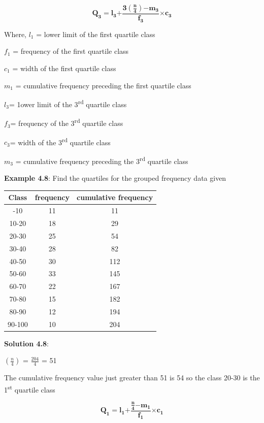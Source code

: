\documentclass[
]{book}
\begin{document}
\[\mathbf{Q}_{\mathbf{3}}\mathbf{=}\mathbf{l}_{\mathbf{3}}\mathbf{+}\frac{\mathbf{3}\left( \frac{\mathbf{n}}{\mathbf{4}} \right)\mathbf{-}\mathbf{m}_{\mathbf{3}}}{\mathbf{f}_{\mathbf{3}}}\mathbf{\times}\mathbf{c}_{\mathbf{3}}\]

Where, \(l_{1}\) = lower limit of the first quartile class

\(f_{1}\) = frequency of the first quartile class

\(c_{1}\) = width of the first quartile class

\(m_{1}\) = cumulative frequency preceding the first quartile class

\(l_{3}\)= 1ower limit of the 3\textsuperscript{rd} quartile class

\(f_{3}\)= frequency of the 3\textsuperscript{rd} quartile class

\(c_{3}\)= width of the 3\textsuperscript{rd} quartile class

\(m_{3}\) = cumulative frequency preceding the 3\textsuperscript{rd} quartile class

\textbf{Example 4.8}: Find the quartiles for the grouped frequency data given

\begin{longtable}[]{@{}ccc@{}}
\toprule\noalign{}
\textbf{Class} & \textbf{frequency} & \textbf{cumulative frequency} \\
\midrule\noalign{}
\endhead
\bottomrule\noalign{}
\endlastfoot
0-10 & 11 & 11 \\
10-20 & 18 & 29 \\
20-30 & 25 & 54 \\
30-40 & 28 & 82 \\
40-50 & 30 & 112 \\
50-60 & 33 & 145 \\
60-70 & 22 & 167 \\
70-80 & 15 & 182 \\
80-90 & 12 & 194 \\
90-100 & 10 & 204 \\
\end{longtable}

\textbf{Solution 4.8}:

\(\left( \frac{n}{4} \right)\) = \(\frac{204}{4}\) = 51

The cumulative frequency value just greater than 51 is 54 so the class
20-30 is the 1\textsuperscript{st} quartile class

\[\mathbf{Q}_{\mathbf{1}}\mathbf{=}\mathbf{l}_{\mathbf{1}}\mathbf{+}\frac{\frac{\mathbf{n}}{\mathbf{4}}\mathbf{-}\mathbf{m}_{\mathbf{1}}}{\mathbf{f}_{\mathbf{1}}}\mathbf{\times}\mathbf{c}_{\mathbf{1}}\]
\end{document}

